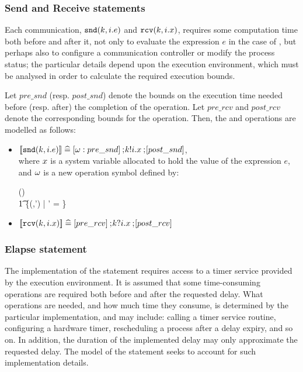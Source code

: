 \subsubsection{Send and Receive statements}
Each communication, $\mbox{\tt snd}(k,i.e)$ and $\mbox{\tt rcv}(k,i.x)$, requires
some computation time both before and after it, not only to evaluate
the expression $e$ in the case of , but perhaps also to configure 
a communication controller or modify the process status; the particular 
details depend upon the execution environment, which must be analysed 
in order to calculate the required execution bounds. 

Let $pre\_snd$ (resp. $post\_snd$) denote
the bounds on the execution time needed before (resp. after) the
completion of the  operation. Let $pre\_rcv$ and $post\_rcv$
denote the corresponding bounds for the  operation. Then,
the  and  operations are modelled as follows:
\begin{itemize}
\item ${\lbrack\!\lbrack} \mbox{\tt snd}(k,i.e) {\rbrack\!\rbrack} \mathrel{\widehat=} [\omega:pre\_snd] \mathbin{\mathrm{;}\!} {k}!{i}.x 
  \mathbin{\mathrm{;}\!} [post\_snd]$, \\
  where $x$ is a system variable allocated to hold the value of the 
  expression $e$, and $\omega$ is a new operation symbol defined by:
  \begin{zed}
    \interpop(\op)  \\
    \t1 \{(\val,\val') \in \valuation \cross \valuation |
               \val' = \}
  \end{zed}
\item ${\lbrack\!\lbrack} \mbox{\tt rcv}(k,i.x){\rbrack\!\rbrack} \mathrel{\widehat=} [pre\_rcv] \mathbin{\mathrm{;}\!} {k}?{i}.x 
  \mathbin{\mathrm{;}\!} [post\_rcv]$
\end{itemize}

\subsubsection{Elapse statement}
The implementation of the  statement requires access
to a timer service provided by the execution environment. 
It is assumed that some time-consuming operations
are required both before and after the requested delay. What operations 
are needed, and how much time they consume, is determined by
the particular implementation, and may include: calling a timer
service routine, configuring a hardware timer, rescheduling a process after 
a delay expiry, and so on. In addition, the duration of the 
implemented delay may only approximate the requested delay. The model
of the  statement seeks to account for such implementation
details.   

